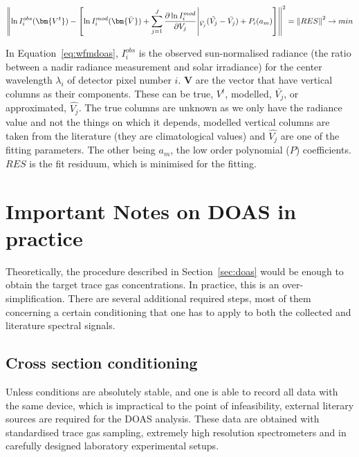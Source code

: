 \begin{equation}
    \centering
    \left \lVert \ln I_{i}^{obs}(\bm{V^t}) - \left[ \ln
            I_{i}^{mod}(\bm{\bar{V}}) +
        \sum_{j=1}^{J} \frac{\partial \ln I_{i}^{mod}}{\partial V_{j}}
        \middle \vert_{\bar{V_{j}}} (\hat{V_{j}} - \bar{V_{j}}) +
        P_{i}(a_m)
    \right] \right\rVert^{2} = \left \lVert RES \right \rVert^2
    \rightarrow min
    \label{eq:wfmdoas}
\end{equation}

In Equation~\ref{eq:wfmdoas}, $I_{i}^{obs}$ is the observed
sun-normalised radiance (the ratio between a nadir radiance measurement
and solar irradiance) for the center wavelength $\lambda_i$ of detector
pixel number $i$. $\bm{V}$ are the vector that have vertical columns as
their components. These can be true, $V^t$, modelled, $\bar{V_j}$, or
approximated, $\hat{V_j}$. The true columns are unknown as we only have
the radiance value and not the things on which it depends, modelled
vertical columns are taken from the literature (they are climatological
values) and $\hat{V_j}$ are one of the fitting parameters. The other
being $a_m$, the low order polynomial ($P$) coefficients. $RES$ is
the fit residuum, which is minimised for the fitting. 

\section{Important Notes on \gls{DOAS} in practice}%
\label{sec:important_notes_on_doas_in_practice}

Theoretically, the procedure described in Section~\ref{sec:doas} would
be enough to obtain the target trace gas concentrations. In practice,
this is an over-simplification. There are several additional required
steps, most of them concerning a certain conditioning that one has to
apply to both the collected and literature spectral signals.

\subsection{Cross section conditioning}%
\label{sub:cross_section_conditioning}

Unless conditions are absolutely stable, and one is able to record all
data with the same device, which is impractical to the point of
infeasibility, external literary sources are required for the \gls{DOAS}
analysis. These data are obtained with standardised trace gas sampling,
extremely high resolution spectrometers and in carefully designed
laboratory experimental setups.

